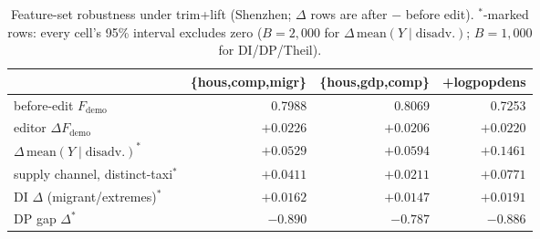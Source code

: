 \begin{table}[!ht]
\caption{Feature-set robustness under trim+lift (Shenzhen; $\Delta$ rows are after
$-$ before edit). $^{*}$-marked rows: every cell's 95\% interval excludes zero
($B = 2{,}000$ for $\Delta\,\mathrm{mean}(Y \mid \mathrm{disadv.})$;
$B = 1{,}000$ for DI/DP/Theil).}
\label{tab:featsets}
\footnotesize
\setlength{\tabcolsep}{3pt}
\begin{tabular}{lrrr}
\toprule
 & \{hous,comp,migr\} & \{hous,gdp,comp\} & +logpopdens \\
\midrule
before-edit $F_{\mathrm{demo}}$ & 0.7988 & 0.8069 & 0.7253 \\
editor $\Delta F_{\mathrm{demo}}$ & $+0.0226$ & $+0.0206$ & $+0.0220$ \\
$\Delta\,\mathrm{mean}(Y \mid \mathrm{disadv.})^{*}$ & $+0.0529$ & $+0.0594$ & $+0.1461$ \\ %
supply channel, distinct-taxi$^{*}$ & $+0.0411$ & $+0.0211$ & $+0.0771$ \\ %
DI $\Delta$ (migrant/extremes)$^{*}$ & $+0.0162$ & $+0.0147$ & $+0.0191$ \\ %
DP gap $\Delta^{*}$ & $-0.890$ & $-0.787$ & $-0.886$ \\ %

\end{tabular}
\end{table}
